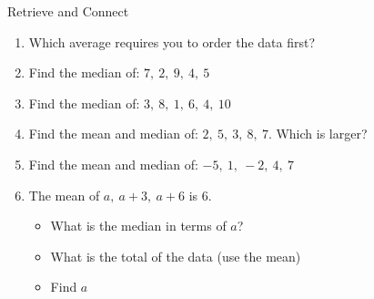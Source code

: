 \documentclass{beamer}
\newcommand{\ashow}[1]{\uncover<2->{\textcolor{red}{\small #1}}}
\newcommand{\ashowq}[1]{\alt<2->{\textcolor{red}{\small #1}}{?}}
\begin{document}
\begin{frame}{Retrieve and Connect}
\vspace{-0.8em}

\footnotesize
\begin{enumerate}\itemsep2pt
  \item Which average requires you to order the data first? \ashow{Median}
  \item Find the median of: $7,\ 2,\ 9,\ 4,\ 5$ \ashow{$=5$}
  \item Find the median of: $3,\ 8,\ 1,\ 6,\ 4,\ 10$ \ashow{$=5$}
  \item Find the mean and median of: $2,\ 5,\ 3,\ 8,\ 7$.  
        Which is larger? \ashow{Mean $=5$, median $=5$ (equal).}
  \item Find the mean and median of: $-5,\ 1,\ -2,\ 4,\ 7$ \ashow{Mean $=1$, median $=1$.}
  \item The mean of $a,\ a+3,\ a+6$ is $6$.
        \begin{itemize}\footnotesize
        \item What is the median in terms of $a$? \ashow{$a+3$}
          \item What is the total of the data (use the mean) \ashow{$18$}
          \item Find $a$ \ashow{$a=3$}
        \end{itemize}
\end{enumerate}

\end{frame}
\end{document}
